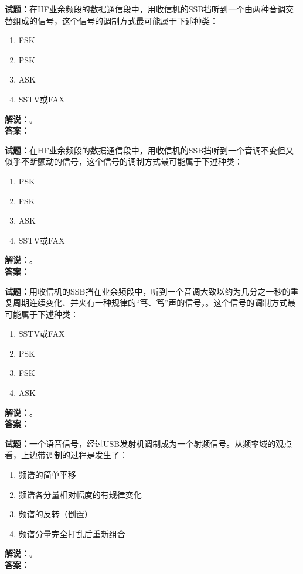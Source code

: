 \documentclass{ctexbook}
\begin{document}
\bigskip

\noindent\textbf{试题：}在HF业余频段的数据通信段中，用收信机的SSB挡听到一个由两种音调交替组成的信号，这个信号的调制方式最可能属于下述种类：
\begin{enumerate}[leftmargin=3em]
  \item FSK
  \item PSK
  \item ASK
  \item SSTV或FAX
\end{enumerate}
\noindent\textbf{解说：}\textbf{}。\\\noindent\textbf{答案：}

\bigskip

\noindent\textbf{试题：}在HF业余频段的数据通信段中，用收信机的SSB挡听到一个音调不变但又似乎不断颤动的信号，这个信号的调制方式最可能属于下述种类：
\begin{enumerate}[leftmargin=3em]
  \item PSK
  \item FSK
  \item ASK
  \item SSTV或FAX
\end{enumerate}
\noindent\textbf{解说：}\textbf{}。\\\noindent\textbf{答案：}

\bigskip

\noindent\textbf{试题：}用收信机的SSB挡在业余频段中，听到一个音调大致以约为几分之一秒的重复周期连续变化、并夹有一种规律的“笃、笃”声的信号，。这个信号的调制方式最可能属于下述种类：
\begin{enumerate}[leftmargin=3em]
  \item SSTV或FAX
  \item PSK
  \item FSK
  \item ASK
\end{enumerate}
\noindent\textbf{解说：}\textbf{}。\\\noindent\textbf{答案：}

\bigskip

\noindent\textbf{试题：}一个语音信号，经过USB发射机调制成为一个射频信号。从频率域的观点看，上边带调制的过程是发生了：
\begin{enumerate}[leftmargin=3em]
  \item 频谱的简单平移
  \item 频谱各分量相对幅度的有规律变化
  \item 频谱的反转（倒置）
  \item 频谱分量完全打乱后重新组合
\end{enumerate}
\noindent\textbf{解说：}\textbf{}。\\\noindent\textbf{答案：}
\end{document}

